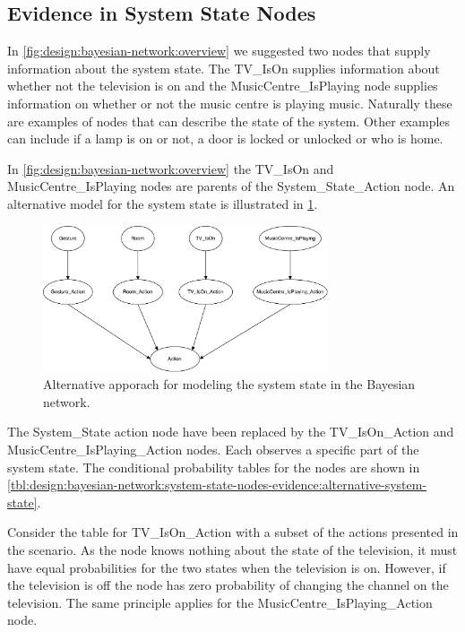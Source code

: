 \subsection{Evidence in System State Nodes}
\label{sec:design:bayesian-network:system-state-nodes-evidence}

In \cref{fig:design:bayesian-network:overview} we suggested two nodes that supply information about the system state. The TV\_IsOn supplies information about whether not the television is on and the MusicCentre\_IsPlaying node supplies information on whether or not the music centre is playing music. Naturally these are examples of nodes that can describe the state of the system. Other examples can include if a lamp is on or not, a door is locked or unlocked or who is home.

In \cref{fig:design:bayesian-network:overview} the TV\_IsOn and MusicCentre\_IsPlaying nodes are parents of the System\_State\_Action node. An alternative model for the system state is illustrated in \cref{fig:design:bayesian-network:system-state-nodes-evidence:alternative-network}. 

\begin{figure}[h!]
\centering
\includegraphics[width=0.75\textwidth]{images/bayesian-network-split-system-state}
\caption{Alternative apporach for modeling the system state in the Bayesian network.}
\label{fig:design:bayesian-network:system-state-nodes-evidence:alternative-network}
\end{figure}

The System\_State action node have been replaced by the TV\_IsOn\_Action and MusicCentre\_IsPlaying\_Action nodes. Each observes a specific part of the system state. The conditional probability tables for the nodes are shown in \cref{tbl:design:bayesian-network:system-state-nodes-evidence:alternative-system-state}.

Consider the table for TV\_IsOn\_Action with a subset of the actions presented in the scenario. As the node knows nothing about the state of the television, it must have equal probabilities for the two states when the television is on. However, if the television is off the node has zero probability of changing the channel on the television. The same principle applies for the MusicCentre\_IsPlaying\_Action node.

